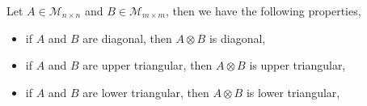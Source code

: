 %

\begin{proposition}
Let $A \in \mathcal{M}_{n \times n}$ and $B \in \mathcal{M}_{m \times m}$, then we have the following properties,
\begin{itemize}
\item if $A$ and $B$ are diagonal, then $A\otimes B$ is diagonal,
\item if $A$ and $B$ are upper triangular, then $A\otimes B$ is upper triangular,
\item if $A$ and $B$ are lower triangular, then $A\otimes B$ is lower triangular,
\end{itemize}
\end{proposition}

